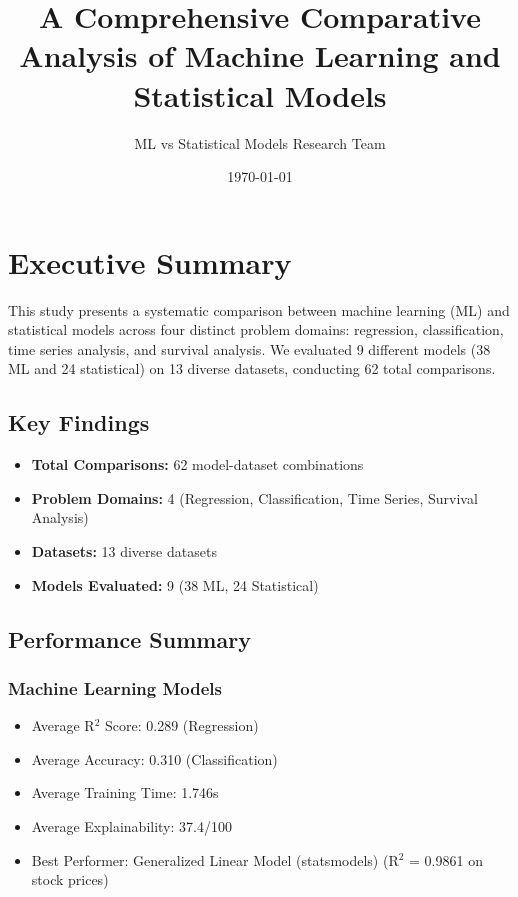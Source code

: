 \documentclass[11pt,a4paper]{article}
\title{A Comprehensive Comparative Analysis of Machine Learning and Statistical Models}
\author{ML vs Statistical Models Research Team}
\date{\today}
\begin{document}
\maketitle

\tableofcontents
\newpage

\section{Executive Summary}

This study presents a systematic comparison between machine learning (ML) and statistical models across four distinct problem domains: regression, classification, time series analysis, and survival analysis. We evaluated 9 different models (38 ML and 24 statistical) on 13 diverse datasets, conducting 62 total comparisons.

\subsection{Key Findings}

\begin{itemize}
\item \textbf{Total Comparisons:} 62 model-dataset combinations
\item \textbf{Problem Domains:} 4 (Regression, Classification, Time Series, Survival Analysis)
\item \textbf{Datasets:} 13 diverse datasets
\item \textbf{Models Evaluated:} 9 (38 ML, 24 Statistical)
\end{itemize}

\subsection{Performance Summary}

\subsubsection{Machine Learning Models}
\begin{itemize}
\item Average R$^2$ Score: 0.289 (Regression)
\item Average Accuracy: 0.310 (Classification)
\item Average Training Time: 1.746s
\item Average Explainability: 37.4/100
\item Best Performer: Generalized Linear Model (statsmodels) (R$^2$ = 0.9861 on stock prices)
\end{itemize}
\end{document}
